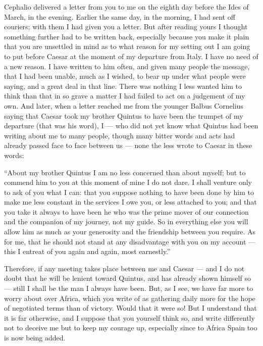 

 Cephalio delivered a letter from you to me on the eighth day before the Ides of March, in the evening. Earlier the same day, in the morning, I had sent off couriers; with them I had given you a letter. But after reading yours I thought something further had to be written back, especially because you make it plain that you are unsettled in mind as to what reason for my setting out I am going to put before Caesar at the moment of my departure from Italy. I have no need of a new reason. I have written to him often, and given many people the message, that I had been unable, much as I wished, to bear up under what people were saying, and a great deal in that line. There was nothing I less wanted him to think than that in so grave a matter I had failed to act on a judgement of my own. And later, when a letter reached me from the younger Balbus Cornelius saying that Caesar took my brother Quintus to have been the trumpet of my departure (that was his word), I --- who did not yet know what Quintus had been writing about me to many people, though many bitter words and acts had already passed face to face between us --- none the less wrote to Caesar in these words:

 ``About my brother Quintus I am no less concerned than about myself; but to commend him to you at this moment of mine I do not dare. I shall venture only to ask of you what I can: that you suppose nothing to have been done by him to make me less constant in the services I owe you, or less attached to you; and that you take it always to have been he who was the prime mover of our connection and the companion of my journey, not my guide. So in everything else you will allow him as much as your generosity and the friendship between you require. As for me, that he should not stand at any disadvantage with you on my account --- this I entreat of you again and again, most earnestly.''

 Therefore, if any meeting takes place between me and Caesar --- and I do not doubt that he will be lenient toward Quintus, and has already shown himself so --- still I shall be the man I always have been. But, as I see, we have far more to worry about over Africa, which you write of as gathering daily more for the hope of negotiated terms than of victory. Would that it were so! But I understand that it is far otherwise, and I suppose that you yourself think so, and write differently not to deceive me but to keep my courage up, especially since to Africa Spain too is now being added.

